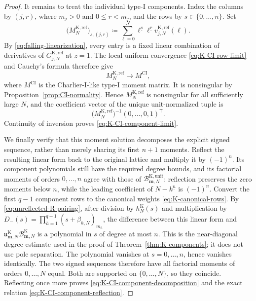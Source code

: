 \documentclass[10pt]{amsart}
\newcommand{\mm}{\boldsymbol m}
\newcommand{\fall}[2]{#1^{\underline{#2}}}
\theoremstyle{plain}
\theoremstyle{definition}
\theoremstyle{remark}
\begin{document}
\begin{proof}
It remains to treat the individual type-I components.  Index the columns
by \((j,r)\), where \(m_j>0\) and \(0\le r<m_j\), and the rows by
\(s\in\{0,\ldots,n\}\).  Set
\begin{equation}
 \bigl(M_N^{\mathrm K,\mathrm{ref}}\bigr)_{s,(j,r)}
 \coloneq
 \sum_{\ell=0}^N\fall{\ell}{s}\fall{\ell}{r}
 v_{j,N}^{\mathrm K,\mathrm{ref}}(\ell).
 \label{eq:K-CI-typeI-moment-matrix}
\end{equation}
By \eqref{eq:falling-linearization}, every entry is a fixed linear
combination of derivatives of \(G_{j,N}^{\mathrm K,\mathrm{ref}}\) at
\(z=1\).  The local uniform convergence
\eqref{eq:K-CI-row-limit} and Cauchy's formula therefore give
\[
 M_N^{\mathrm K,\mathrm{ref}}\longrightarrow M^{\mathrm{CI}},
\]
where \(M^{\mathrm{CI}}\) is the Charlier-I-like type-I moment matrix.
It is nonsingular by Proposition~\ref{prop:CI-normality}.  Hence
\(M_N^{\mathrm K,\mathrm{ref}}\) is nonsingular for all sufficiently
large \(N\), and the coefficient vector of the unique unit-normalized
tuple is
\[
 \bigl(M_N^{\mathrm K,\mathrm{ref}}\bigr)^{-1}
 (0,\ldots,0,1)^{\mathsf T}.
\]
Continuity of inversion proves \eqref{eq:K-CI-component-limit}.

We finally verify that this moment solution decomposes the explicit signed
sequence, rather than merely sharing its first \(n+1\) moments. Reflect
the resulting linear form back to the original lattice and multiply it by
\((-1)^n\).  Its component polynomials still have the required degree
bounds, and its factorial moments of orders \(0,\ldots,n\) agree with
those of \(\mathcal B_{\mm,N}^{\mathrm K,\mathrm{unit}}\): reflection
preserves the zero moments below \(n\), while the leading coefficient of
\(\fall{N-k}{n}\) is \((-1)^n\).  Convert the first \(q-1\) component
rows to the canonical weights \eqref{eq:K-canonical-rows}. By
\eqref{eq:unreflected-R-pairing}, after division by
\(h_N^{\mathrm K}(s)\) and multiplication by
\(D_-(s)=\prod_{h=1}^{q-1}(s+\beta_{h,N})_{m_h}\), the difference
between this linear form and
\(\mathfrak u_{\mm,N}^{\mathrm K}\mathcal B_{\mm,N}^{\mathrm K}\)
is a polynomial in \(s\) of degree at most \(n\).  This is the
near-diagonal degree estimate used in the proof of
Theorem~\ref{thm:K-components}; it does not use pole separation.  The
polynomial vanishes at \(s=0,\ldots,n\), hence vanishes identically.
The two signed sequences therefore have all factorial moments of orders
\(0,\ldots,N\) equal.  Both are supported on \(\{0,\ldots,N\}\), so
they coincide. Reflecting once more proves
\eqref{eq:K-CI-component-decomposition} and the exact relation
\eqref{eq:K-CI-component-reflection}.
\end{proof}
\end{document}
